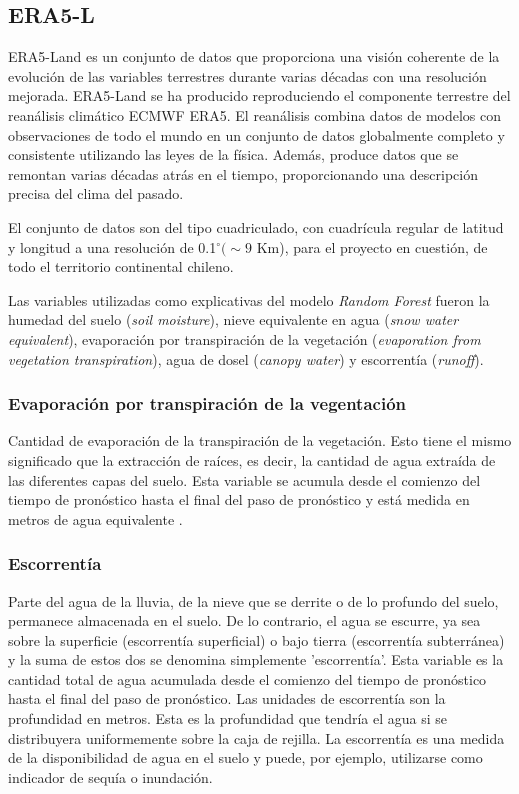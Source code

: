     \subsection{ERA5-L}
    ERA5-Land es un conjunto de datos que proporciona una visión coherente de la evolución de las variables terrestres durante varias décadas 
    con una resolución mejorada. ERA5-Land se ha producido reproduciendo el componente terrestre del reanálisis climático ECMWF ERA5. El reanálisis combina 
    datos de modelos con observaciones de todo el mundo en un conjunto de datos globalmente completo y consistente utilizando las leyes de la física. 
    Además, produce datos que se remontan varias décadas atrás en el tiempo, proporcionando una descripción precisa del clima del pasado\cite{ERA5-L}.

    El conjunto de datos son del tipo cuadriculado, con cuadrícula regular de latitud y longitud a una resolución de 0.1$^{\circ} (\sim 9$ Km), 
    para el proyecto en cuestión, de todo el territorio continental chileno.

    Las variables utilizadas como explicativas del modelo \textit{Random Forest} fueron la humedad del suelo (\textit{soil moisture}), nieve equivalente en agua (\textit{snow water equivalent}),
    evaporación por transpiración de la vegetación (\textit{evaporation from vegetation transpiration}), agua de dosel (\textit{canopy water}) y escorrentía (\textit{runoff}).
    
    \subsubsection{Evaporación por transpiración de la vegentación}
    Cantidad de evaporación de la transpiración de la vegetación. Esto tiene el mismo significado que la extracción de raíces, 
    es decir, la cantidad de agua extraída de las diferentes capas del suelo. 
    Esta variable se acumula desde el comienzo del tiempo de pronóstico hasta el final del paso de pronóstico y está medida en metros de agua equivalente \cite{ERA5-L}.

    \subsubsection{Escorrentía}
    Parte del agua de la lluvia, de la nieve que se derrite o de lo profundo del suelo, permanece almacenada en el suelo. De lo contrario, el agua se escurre, ya sea sobre la superficie (escorrentía superficial)
    o bajo tierra (escorrentía subterránea) y la suma de estos dos se denomina simplemente 'escorrentía'. Esta variable es la cantidad total de agua acumulada desde el comienzo del tiempo de pronóstico hasta el 
    final del paso de pronóstico. Las unidades de escorrentía son la profundidad en metros. Esta es la profundidad que tendría el agua si se distribuyera uniformemente sobre la caja de rejilla.
    La escorrentía es una medida de la disponibilidad de agua en el suelo y puede, por ejemplo, utilizarse como indicador de sequía o inundación.

